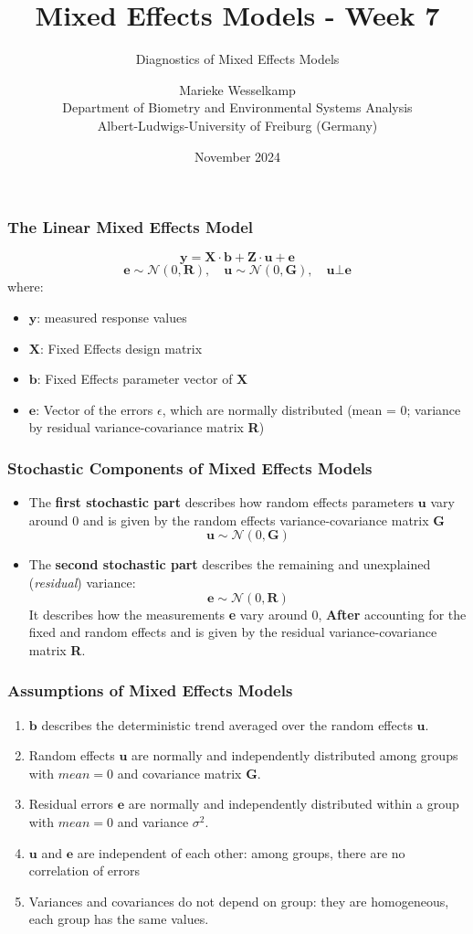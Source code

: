 \documentclass{beamer}
\title{Mixed Effects Models - Week 7}
\subtitle{Diagnostics of Mixed Effects Models}
\author{Marieke Wesselkamp\\Department of Biometry and Environmental Systems Analysis\\Albert-Ludwigs-University of Freiburg (Germany)}
\date{November 2024}
\begin{document}
\frame{\titlepage}

\begin{frame}
    \frametitle{The Linear Mixed Effects Model}
    \[
    \mathbf{y} = \mathbf{X} \cdot \mathbf{b} + \mathbf{Z} \cdot \mathbf{u} + \mathbf{e}
    \]
    \[
    \mathbf{e} \sim \mathcal{N}(0, \mathbf{R}), \quad \mathbf{u} \sim \mathcal{N}(0, \mathbf{G}), \quad \mathbf{u} \bot \mathbf{e}
    \]
    where:
    \begin{itemize}
        \item $\mathbf{y}$: measured response values
        \item $\mathbf{X}$: Fixed Effects design matrix
        \item $\mathbf{b}$: Fixed Effects parameter vector of $\mathbf{X}$
        \item $\mathbf{e}$: Vector of the errors $\epsilon$, which are normally distributed (mean = 0; variance by residual variance-covariance matrix \textbf{R})
    \end{itemize}
\end{frame}

\begin{frame}
    \frametitle{Stochastic Components of Mixed Effects Models}
    \begin{itemize}
        \item The \textbf{first stochastic part} describes how random effects parameters $\mathbf{u}$ vary around 0 and is given by the random effects variance-covariance matrix \textbf{G}
        \[
        \mathbf{u} \sim \mathcal{N}(0, \mathbf{G})
        \]
        \item The \textbf{second stochastic part} describes the remaining and unexplained (\textit{residual}) variance:
        \[
        \mathbf{e} \sim \mathcal{N}(0, \mathbf{R})
        \]
        It describes how the measurements \textbf{e} vary around 0, \textbf{After} accounting for the fixed and random effects and is given by the residual variance-covariance matrix \textbf{R}.
    \end{itemize}
\end{frame}

\begin{frame}
    \frametitle{Assumptions of Mixed Effects Models}
    \begin{enumerate}
        \item $\mathbf{b}$ describes the deterministic trend averaged over the random effects $\mathbf{u}$.
        \item Random effects $\mathbf{u}$ are normally and independently distributed among groups with $\mathit{mean = 0}$ and covariance matrix $\mathbf{G}$.
        \item Residual errors $\mathbf{e}$ are normally and independently distributed within a group with $\mathit{mean = 0}$ and variance $\sigma^2$.
        \item $\mathbf{u}$ and $\mathbf{e}$ are independent of each other: among groups, there are no correlation of errors 
        \item Variances and covariances do not depend on group: they are homogeneous, each group has the same values.
    \end{enumerate}
\end{frame}
\end{document}
